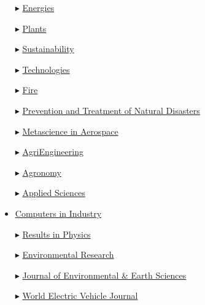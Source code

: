 \begin{itemize}
    \item[$\blacktriangleright$] \href{https://www.mdpi.com/journal/energies/}{Energies}

    \item[$\blacktriangleright$] \href{https://www.mdpi.com/journal/plants/}{Plants}

    \item[$\blacktriangleright$] \href{https://www.mdpi.com/journal/sustainability/}{Sustainability}

    \item[$\blacktriangleright$] \href{https://www.mdpi.com/journal/technologies/}{Technologies}

    \item[$\blacktriangleright$] \href{https://www.mdpi.com/journal/fire/}{Fire}

    \item[$\blacktriangleright$] \href{https://ojs.ukscip.com/index.php/ptnd/}{Prevention and Treatment of Natural Disasters}

    \item[$\blacktriangleright$] \href{https://www.aimspress.com/journal/mina/}{Metascience in Aerospace}

    \item[$\blacktriangleright$] \href{https://www.mdpi.com/journal/agriengineering/}{AgriEngineering}
    
    \item[$\blacktriangleright$] \href{https://www.mdpi.com/journal/agronomy/}{Agronomy}

    \item[$\blacktriangleright$] \href{https://www.mdpi.com/journal/applsci/}{Applied Sciences}
    
    \item \href{https://www.sciencedirect.com/journal/computers-in-industry/}{Computers in Industry}

    \item[$\blacktriangleright$] \href{https://www.sciencedirect.com/journal/results-in-physics/}{Results in Physics}

    \item[$\blacktriangleright$] \href{https://www.sciencedirect.com/journal/environmental-research/ }{Environmental Research}
    
    \item[$\blacktriangleright$] \href{https://journals.bilpubgroup.com/index.php/jees/}{Journal of Environmental \& Earth Sciences}

    \item[$\blacktriangleright$] \href{https://www.mdpi.com/journal/wevj/}{World Electric Vehicle Journal}
    
\end{itemize}

